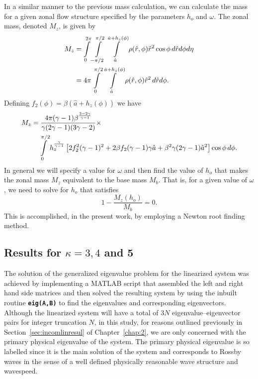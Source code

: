 In a similar manner to the previous mass calculation, we can calculate the mass for a given zonal flow structure specified by the parameters $h_o$ and $\omega$. The zonal mass, denoted $M_z$, is given by
\begin{align}
M_z&=\int\limits_0^{2\pi} \int\limits_{-\pi/2}^{\pi/2} \int\limits_{\hat{a}}^{\hat{a}+h_z(\phi)} \rho(\hat{r},\phi)\hat{r}^2 \cos\phi\,d\hat{r} d\phi d\eta \notag  \\
&=4\pi \int\limits_{0}^{\pi/2} \int\limits_{\hat{a}}^{\hat{a}+h_z(\phi)} \rho(\hat{r},\phi)\hat{r}^2\,d\hat{r} d\phi. \label{eq:commassz}
\end{align}
Defining $f_2(\phi)=\beta(\hat{a}+h_z(\phi))$ we have
\begin{align}
M_z &= \frac{4\pi (\gamma-1)\beta^{\frac{3-2\gamma}{\gamma-1}}}{\gamma(2\gamma-1)(3\gamma-2)} \times \notag \\
&\quad \int\limits_{0}^{\pi/2} h_z^{\frac{\gamma}{\gamma-1}} \left[2f_2^2(\gamma-1)^2 + 2\beta f_2 (\gamma-1)\gamma \hat{a} + \beta^2\gamma(2\gamma-1)\hat{a}^2 \right]\cos\phi\,d\phi. \label{eq:mzcomp}
\end{align}
In general we will specify a value for $\omega$ and then find the value of $h_o$ that makes the zonal mass $M_z$ equivalent to the base mass $M_b$. That is, for a given value of $\omega$, we need to solve for $h_o$ that satisfies
\begin{equation}
1-\frac{M_z(h_o)}{M_b}=0.
\end{equation}
This is accomplished, in the present work, by employing a Newton root finding method.

\subsection[Results for $\kappa=3,4$ and 5]{Results for \boldmath$\kappa=3,4$ and 5}
The solution of the generalized eigenvalue problem for the linearized system was achieved by implementing a MATLAB script that assembled the left and right hand side matrices and then solved the resulting system by using the inbuilt routine \texttt{\textbf{eig(A,B)}} to find the eigenvalues and corresponding eigenvectors. Although the linearized system will have a total of $3N$ eigenvalue--eigenvector pairs for integer truncation $N$, in this study, for reasons outlined previously in Section~\ref{sec:incomlinresul} of Chapter~\ref{chap:2}, we are only concerned with the primary physical eigenvalue of the system. The primary physical eigenvalue is so labelled since it is the main solution of the system and corresponds to Rossby waves in the sense of a well defined physically reasonable wave structure and wavespeed.

